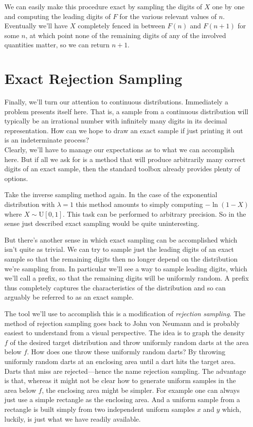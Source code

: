 \documentclass{article}
\begin{document}
We can easily make this procedure exact by sampling the digits of $X$ one by one and computing the leading digits of $F$ for the various relevant values of $n$. Eventually we'll have $X$ completely fenced in between $F(n)$ and $F(n+1)$ for some $n$, at which point none of the remaining digits of any of the involved quantities matter, so we can return $n+1$.

\section{Exact Rejection Sampling}

Finally, we'll turn our attention to continuous distributions. Immediately a problem presents itself here. That is, a sample from a continuous distribution will typically be an irrational number with infinitely many digits in its decimal representation. How can we hope to draw an exact sample if just printing it out is an indeterminate process?\\
Clearly, we'll have to manage our expectations as to what we can accomplish here. But if all we ask for is a method that will produce arbitrarily many correct digits of an exact sample, then the standard toolbox already provides plenty of options.

Take the inverse sampling method again. In the case of the exponential distribution with $\lambda = 1$ this method amounts to simply computing $-\ln(1-X)$ where $X \sim \text{U}[0,1]$. This task can be performed to arbitrary precision. So in the sense just described exact sampling would be quite uninteresting.

But there's another sense in which exact sampling can be accomplished which isn't quite as trivial. We can try to sample just the leading digits of an exact sample so that the remaining digits then no longer depend on the distribution we're sampling from. In particular we'll see a way to sample leading digits, which we'll call a prefix, so that the remaining digits will be uniformly random. A prefix thus completely captures the characteristics of the distribution and so can arguably be referred to as an exact sample.

The tool we'll use to accomplish this is a modification of \textit{rejection sampling}. The method of rejection sampling goes back to John von Neumann and is probably easiest to understand from a visual perspective. The idea is to graph the density $f$ of the desired target distribution and throw uniformly random darts at the area below $f$. How does one throw these uniformly random darts? By throwing uniformly random darts at an enclosing area until a dart hits the target area. Darts that miss are rejected---hence the name rejection sampling. The advantage is that, whereas it might not be clear how to generate uniform samples in the area below $f$, the enclosing area might be simpler. For example one can always just use a simple rectangle as the enclosing area. And a uniform sample from a rectangle is built simply from two independent uniform samples $x$ and $y$ which, luckily, is just what we have readily available.
\end{document}
